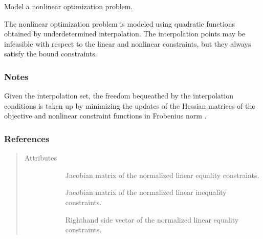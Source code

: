 \documentclass[letterpaper,10pt,english]{sphinxmanual}
\begin{document}
\begin{fulllineitems}
\label{\detokenize{refs/generated/cobyqa.optimize.Models:cobyqa.optimize.Models}}
\sphinxAtStartPar
Model a nonlinear optimization problem.

\sphinxAtStartPar
The nonlinear optimization problem is modeled using quadratic functions
obtained by underdetermined interpolation. The interpolation points may be
infeasible with respect to the linear and nonlinear constraints, but they
always satisfy the bound constraints.
\subsubsection*{Notes}

\sphinxAtStartPar
Given the interpolation set, the freedom bequeathed by the interpolation
conditions is taken up by minimizing the updates of the Hessian matrices of
the objective and nonlinear constraint functions in Frobenius norm .
\subsubsection*{References}

\sphinxAtStartPar
{}
\begin{quote}\begin{description}
\item[{Attributes}] \leavevmode\begin{description}
\item[{}] \leavevmode
\sphinxAtStartPar
Jacobian matrix of the normalized linear equality constraints.

\item[{}] \leavevmode
\sphinxAtStartPar
Jacobian matrix of the normalized linear inequality constraints.

\item[{}] \leavevmode
\sphinxAtStartPar
Right\sphinxhyphen{}hand side vector of the normalized linear equality constraints.


\end{description}
\end{description}
\end{quote}
\end{fulllineitems}
\end{document}
